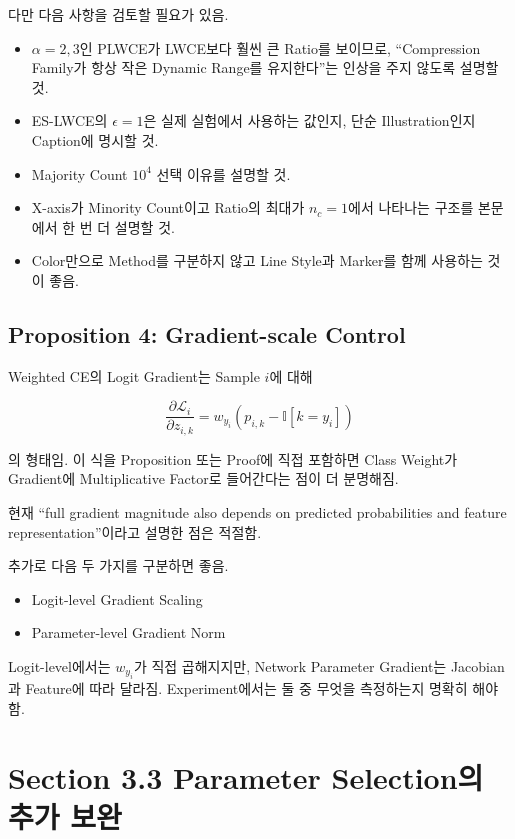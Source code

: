 \documentclass[11pt,a4paper]{article}
\begin{document}
다만 다음 사항을 검토할 필요가 있음.

\begin{itemize}
\item \(\alpha=2,3\)인 PLWCE가 LWCE보다 훨씬 큰 Ratio를 보이므로, ``Compression Family가 항상 작은 Dynamic Range를 유지한다''는 인상을 주지 않도록 설명할 것.
\item ES-LWCE의 \(\epsilon=1\)은 실제 실험에서 사용하는 값인지, 단순 Illustration인지 Caption에 명시할 것.
\item Majority Count \(10^4\) 선택 이유를 설명할 것.
\item X-axis가 Minority Count이고 Ratio의 최대가 \(n_c=1\)에서 나타나는 구조를 본문에서 한 번 더 설명할 것.
\item Color만으로 Method를 구분하지 않고 Line Style과 Marker를 함께 사용하는 것이 좋음.
\end{itemize}

\subsection{Proposition 4: Gradient-scale Control}

Weighted CE의 Logit Gradient는 Sample \(i\)에 대해

\[
\frac{\partial \mathcal{L}_i}{\partial z_{i,k}}
=
w_{y_i}\left(p_{i,k}-\mathbb{I}[k=y_i]\right)
\]

의 형태임. 이 식을 Proposition 또는 Proof에 직접 포함하면 Class Weight가 Gradient에 Multiplicative Factor로 들어간다는 점이 더 분명해짐.

현재 ``full gradient magnitude also depends on predicted probabilities and feature representation''이라고 설명한 점은 적절함.

추가로 다음 두 가지를 구분하면 좋음.

\begin{itemize}
\item Logit-level Gradient Scaling
\item Parameter-level Gradient Norm
\end{itemize}

Logit-level에서는 \(w_{y_i}\)가 직접 곱해지지만, Network Parameter Gradient는 Jacobian과 Feature에 따라 달라짐. Experiment에서는 둘 중 무엇을 측정하는지 명확히 해야 함.

\section{Section 3.3 Parameter Selection의 추가 보완}
\end{document}
